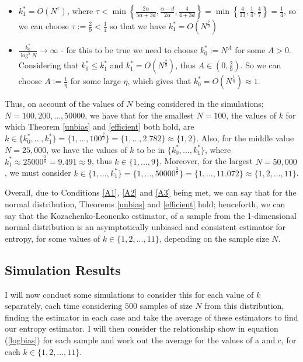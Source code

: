 \documentclass{report}
\begin{document}
\begin{itemize}
\item $k_{1}^{*} = O(N^{\tau})$, where $\tau < \min \left\{ \frac{2 \alpha}{5 \alpha + 3d} , \frac{\alpha - d}{2 \alpha} , \frac{4}{4 + 3d} \right\} = \min \left\{ \frac{4}{13}, \frac{1}{4}, \frac{4}{7} \right\} = \frac{1}{4}$, so we can choose $\tau := \frac{2}{9} < \frac{1}{4}$ so that we have $k_{1}^{*} = O(N^{\frac{2}{9}})$

\item $\frac{k_{0}^{*}}{\log^{5}{N}} \to \infty$ - for this to be true we need to choose $k_{0}^{*} := N^A$ for some $A>0$. Considering that $k_{0}^{*} \leq k_{1}^{*}$ and $ k_{1}^{*} = O(N^{\frac{2}{9}})$, thus $A \in (0, \frac{2}{9})$. So we can choose $A := \frac{1}{\eta}$ for some large $\eta$, which gives that $k_{0}^{*} = O(N^{\frac{1}{\eta}}) \approx 1$.
\end{itemize}

Thus, on account of the values of $N$ being considered in the simulations; $N=100, 200, ..., 50000$, we have that for the smallest $N=100$, the values of $k$ for which Theorem \ref{unbias} and \ref{efficient} both hold, are $k \in \{k_{0}^{*}, ..., k_{1}^{*} \} = \{1, ... , 100^{\frac{2}{9}}\} = \{1, ..., 2.782\} \approx \{1, 2\}$. Also, for the middle value $N=25,000$, we have the values of $k$ to be in $\{k_{0}^{*}, ..., k_{1}^{*} \}$, where $ k_{1}^{*} \approx 25000^{\frac{2}{9}} = 9.491 \approx 9$, thus $k \in \{ 1, ..., 9\}$. Moreover, for the largest $N=50,000$, we must consider $k \in \{1, ..., k_{1}^{*} \} = \{1, ... , 50000^{\frac{2}{9}}\} = \{1, ..., 11.072\} \approx \{1, 2, ..., 11\}$.

Overall, due to Conditions \ref{A1}, \ref{A2} and \ref{A3} being met, we can say that for the normal distribution, Theorems \ref{unbias} and \ref{efficient} hold; henceforth, we can say that the Kozachenko-Leonenko estimator, of a sample from the 1-dimensional normal distribution is an asymptotically unbiased and consistent estimator for entropy, for some values of $k \in \{1, 2, ..., 11\}$, depending on the sample size $N$. 






\subsection{Simulation Results}

I will now conduct some simulations to consider this for each value of $k$ separately, each time considering $500$ samples of size $N$ from this distribution, finding the estimator in each case and take the average of these estimators to find our entropy estimator. I will then consider the relationship show in equation (\ref{logbias}) for each sample and work out the average for the values of a and c, for each $k \in \{1, 2, ..., 11\}$. 
\end{document}
